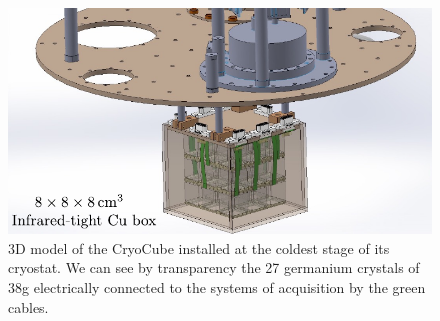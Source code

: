 \begin{figure}
\centering
\includegraphics[scale=1]{Figures/Introduction/cryocube.pdf}
\caption{3D model of the CryoCube installed at the coldest stage of its cryostat. We can see by transparency the 27 germanium crystals of 38g electrically connected to the systems of acquisition by the green cables.}
\label{fig:cryocube}
\end{figure}


